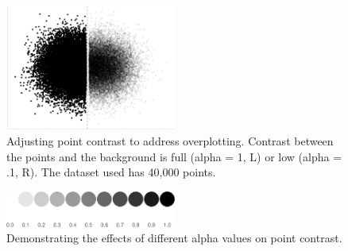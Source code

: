 \documentclass[manuscript, review, anonymous, screen]{acmart}
\begin{document}
\begin{figure}

\includegraphics[width=0.5\textwidth,height=\textheight]{size_and_opacity_files/figure-pdf/fig-overplotting-examples-1.pdf} \hfill{}

\caption{\label{fig-overplotting-examples}Adjusting point contrast to
address overplotting. Contrast between the points and the background is
full (alpha = 1, L) or low (alpha = .1, R). The dataset used has 40,000
points.}

\end{figure}

\begin{figure}

\includegraphics[width=0.5\textwidth,height=\textheight]{size_and_opacity_files/figure-pdf/fig-alpha-examples-1.pdf} \hfill{}

\caption{\label{fig-alpha-examples}Demonstrating the effects of
different alpha values on point contrast.}

\end{figure}
\end{document}
